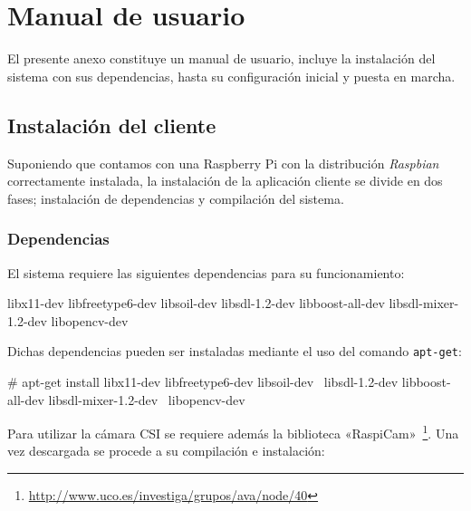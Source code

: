 \chapter{Manual de usuario}
\label{chap:anexo_manual}

El presente anexo constituye un manual de usuario, incluye la instalación del sistema con sus dependencias, hasta
su configuración inicial y puesta en marcha.

\section{Instalación del cliente}

Suponiendo que contamos con una Raspberry Pi con la distribución \textit{Raspbian} correctamente instalada,
la instalación de la aplicación cliente se divide en dos fases; instalación de dependencias y
compilación del sistema.

\subsection{Dependencias}

El sistema requiere las siguientes dependencias para su funcionamiento:

\vspace{-0.1cm}

\begin{listing}[%
  style    = consola]
libx11-dev
libfreetype6-dev
libsoil-dev
libsdl-1.2-dev
libboost-all-dev
libsdl-mixer-1.2-dev
libopencv-dev
\end{listing}

\vspace{-0.1cm}

Dichas dependencias pueden ser instaladas mediante el uso del comando \texttt{apt-get}:

\vspace{-0.1cm}

\begin{listing}[%
  style=consola]
# apt-get install libx11-dev libfreetype6-dev libsoil-dev \
    libsdl-1.2-dev libboost-all-dev libsdl-mixer-1.2-dev \
    libopencv-dev
\end{listing}

\vspace{-0.1cm}

Para utilizar la cámara CSI se requiere además la biblioteca
«RaspiCam»~\footnote{\url{http://www.uco.es/investiga/grupos/ava/node/40}}. Una vez descargada se procede
a su compilación e instalación:

